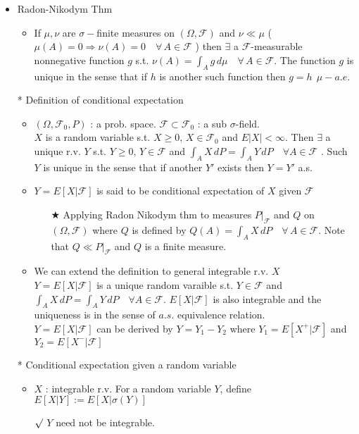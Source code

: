\documentclass[12pt, A4]{article}
\newcommand{\rmk}{$\surd$}
\newcommand{\trick}{$\bigstar$}
\newcommand{\F}{\mathcal{F}}
\begin{document}
\begin{itemize}
\begin{itemize}
\begin{enumerate}
		\end{enumerate}
	\end{itemize}
	\item Radon-Nikodym Thm
	\begin{itemize}
		\item If $\mu, \nu$ are $\sigma-$finite measures on $(\Omega, \F)$ and $\nu \ll \mu$ ( $\mu(A)=0\Rightarrow \nu(A)=0 \quad \forall\, A\in \F$ ) then $\exists$ a $\F$-measurable nonnegative function $g$ s.t. $\nu(A)=\int_A g\, d\mu\quad \forall\, A\in \F$. The  function $g$ is unique in the sense that if $h$ is another such function then $g=h\;\, \mu-a.e.$
	\end{itemize}
	\item[*] Definition of conditional expectation
	\begin{itemize}
		\item $(\Omega, \F_0, P)$ : a prob. space. \;$\F\subset \F_0$ : a sub $\sigma$-field. \\ $X$ is a random variable s.t. $X\geq 0, \, X\in \F_0$ and $E|X|<\infty$. Then $\exists$ a unique r.v. $Y$ s.t. $Y\geq 0, \, Y\in \F$ and $\int_A X\, dP=\int_A Y\, dP\quad \forall A\in \F$ . Such $Y$ is unique in the sense that if another $Y'$ exists then $Y=Y'$ a.s.
		\item $Y=E[X|\F]$ is said to be conditional expectation of $X$ given $\F$
		\begin{itemize}
			\item[\trick] Applying Radon Nikodym thm to measures $P|_{\F}$ and $Q$ on $(\Omega, \F)$  where $Q$ is defined by $Q(A)=\int_A X\,dP\quad \forall \, A\in \F$. Note that $Q \ll P|_\F$ and $Q$ is a finite measure.
		\end{itemize}
		\item We can extend the definition to general integrable r.v. $X$ \\ $Y=E[X|\F]$ is a unique random varaible s.t. $Y\in \F$ and $\int_A X\, dP=\int_A Y\, dP\quad \forall A\in \F$. $E[X|\F]$ is also integrable and the uniqueness is in the sense of $a.s.$ equivalence relation. \\ $Y=E[X|\F]$ can be derived by $Y=Y_1-Y_2$ where $Y_1=E[X^+|\F]$ and $Y_2=E[X^-|\F]$
	\end{itemize} 
	\item[*] Conditional expectation given a random variable
	\begin{itemize}
		\item $X$ : integrable r.v. For a random variable $Y$, define $E[X|Y]:=E[X|\sigma(Y)]$ 
		\item[\rmk] $Y$ need not be integrable.

\end{itemize}
\end{itemize}
\end{document}
